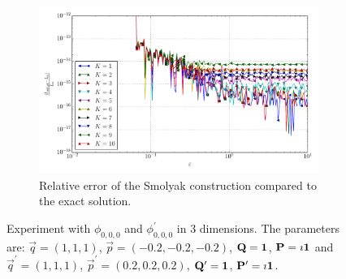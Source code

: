 \documentclass[a4paper,10pt]{article}
\begin{document}
\begin{figure}[ht!]
\begin{subfigure}[t]{0.5\linewidth}
    \includegraphics[width=\linewidth]{./plots/tp_sg_3d_conv_eps_(0,0,0)_(0,0,0)_err_rel_nsd_gk.pdf}
    \caption{Relative error of the Smolyak construction compared to the exact solution.}
    \label{fig:tp_sg_3d_conv_p_000_000_err_rel_nsd_gk}
  \end{subfigure}
  \label{fig:tp_sg_3d_conv_p_000_000}
  \caption{Experiment with $\phi_{0,0,0}$ and $\phi_{0,0,0}^{\prime}$
  in 3 dimensions.
  The parameters are:
  $\vec{q} = (1, 1, 1)$,
  $\vec{p} = (-0.2, -0.2, -0.2)$,
  $\mathbf{Q} = \mathbf{1}$,
  $\mathbf{P} = \imath \mathbf{1}$
  and
  $\vec{q}^\prime = (1, 1, 1)$,
  $\vec{p}^\prime = (0.2, 0.2, 0.2)$,
  $\mathbf{Q}^\prime = \mathbf{1}$,
  $\mathbf{P}^\prime = \imath \mathbf{1}$.}
\end{figure}
\end{document}
